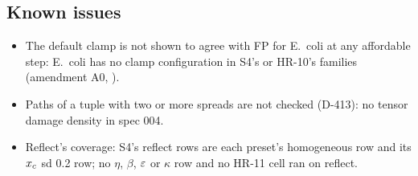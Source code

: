 \subsection{Known issues}\label{sec:lgv-issues}

\begin{itemize}[nosep]
  \item The default clamp is not shown to agree with FP for E.~coli at any affordable step: E.~coli has no clamp
    configuration in S4's or HR-10's families (amendment A0, ).
  \item Paths of a tuple with two or more spreads are not checked (D-413): no tensor damage density in spec 004.
  \item Reflect's coverage: S4's  reflect rows are each preset's
    homogeneous row and its $x_c$ sd 0.2 row; no $\eta$, $\beta$, $\varepsilon$ or $\kappa$ row and no HR-11 cell ran on
    reflect.
\end{itemize}

